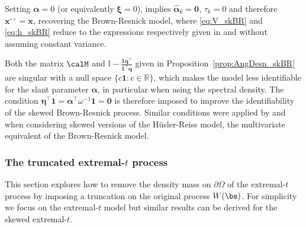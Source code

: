 \documentclass[12pt]{article}
\begin{document}
\begin{corollary}
\label{cor:BR}
Setting $\bm \alpha = 0$ (or equivalently $\bm \xi=0$), implies $\hat{\bm \alpha}_k = \bm 0$, $\tau_k=0$ and therefore $\bm x^{\circ\circ} = \bm x$, recovering the Brown-Resnick model, where \eqref{eq:V_skBR} and \eqref{eq:h_skBR} reduce to the expressions respectively given in \citet{Huser.Davison:2013a}
and \citet{Wadsworth.Tawn:2014} without assuming constant variance.
\end{corollary}

Both the matrix $\calM$ and $\mathbb{I} - \frac{\bm 1\bm q^\top}{\bm 1^\top \bm q}$ given in Proposition~\ref{prop:AngDesn_skBR} are singular with a null space $\{c\bm 1:c\in\mathbb R\}$, which makes the model less identifiable for the slant parameter $\bm \alpha$, in particular when using the spectral density. The condition $\bm \eta^\top \bm 1 = \bm \alpha^\top \omega^{-1}  \bm 1 = \bm 0$ is therefore imposed to improve the identifiability of the skewed Brown-Resnick process. Similar conditions were applied by \citet{Padoan:2011} and \citet{Beranger.etal:2019} when considering skewed versions of the H\"{u}sler-Reiss model, the multivariate equivalent of the Brown-Resnick model. 

\subsubsection{The truncated extremal-$t$ process}

This section explores how to remove the density mass on $\partial\Omega$ of the extremal-$t$ process by imposing a truncation on the original process $W(\bs)$. For simplicity we focus on the extremal-$t$ model but similar results can be derived for the skewed extremal-$t$.  
\end{document}
